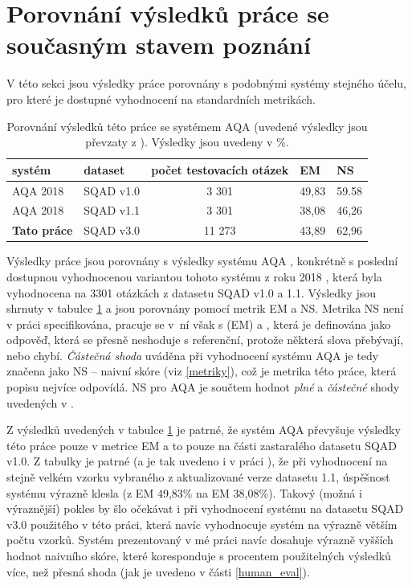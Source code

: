 \section*{Porovnání výsledků práce se současným stavem poznání}
V této sekci jsou výsledky práce porovnány s podobnými systémy stejného účelu, pro které je dostupné vyhodnocení na standardních metrikách.\par
\begin{table}[H]
\centering
\begin{tabular}{|l|l|c||l|l|}
\hline
systém     & dataset   & počet testovacích otázek & \textbf{EM} & \textbf{NS} \\ \hline \hline
AQA 2018   & SQAD v1.0 & 3 301                    & 49,83       & 59.58       \\ \hline
AQA 2018   & SQAD v1.1 & 3 301                    & 38,08       & 46,26       \\ \hline
\textbf{Tato práce} & SQAD v3.0 & 11 273                   & 43,89       & 62,96       \\ \hline
\end{tabular}
\caption{Porovnání výsledků této práce se systémem AQA \cite{aqa} (uvedené výsledky jsou převzaty z \cite{aqa2018}). Výsledky jsou uvedeny v \%.}
\label{tab:aqa_compare}
\end{table}
Výsledky práce jsou porovnány s výsledky systému AQA \cite{aqa}, konkrétně s poslední dostupnou vyhodnocenou variantou tohoto systému z roku 2018 \cite{aqa2018}, která byla vyhodnocena na 3301 otázkách z datasetu SQAD v1.0 a 1.1. Výsledky jsou shrnuty v tabulce \ref{tab:aqa_compare} a jsou porovnány pomocí metrik EM a NS. Metrika NS není v práci specifikována, pracuje se v~ní však s  (EM) a , která je definována jako odpověď, která se přesně neshoduje s referenční, protože některá slova přebývají, nebo chybí. \emph{Částečná shoda} uváděna při vyhodnocení systému AQA je tedy značena jako NS -- naivní skóre (viz \ref{metriky}), což je metrika této práce, která popisu nejvíce odpovídá. NS pro AQA je součtem hodnot \emph{plné} a \emph{částečné} shody uvedených v \cite{aqa2018}.\par
Z výsledků uvedených v tabulce \ref{tab:aqa_compare} je patrné, že systém AQA převyšuje výsledky této práce pouze v metrice EM a to pouze na části zastaralého datasetu SQAD v1.0. Z tabulky je patrné (a je tak uvedeno i v práci \cite{aqa2018}), že při vyhodnocení na stejně velkém vzorku vybraného z aktualizované verze datasetu 1.1, úspěšnost systému výrazně klesla (z EM 49,83\% na EM 38,08\%). Takový (možná i výraznější) pokles by šlo očekávat i při vyhodnocení systému na datasetu SQAD v3.0 použitého v této práci, která navíc vyhodnocuje systém na výrazně větším počtu vzorků. Systém prezentovaný v mé práci navíc dosahuje výrazně vyšších hodnot naivního skóre, které koresponduje s procentem použitelných výsledků více, než přesná shoda (jak je uvedeno v části \ref{human_eval}).\par

